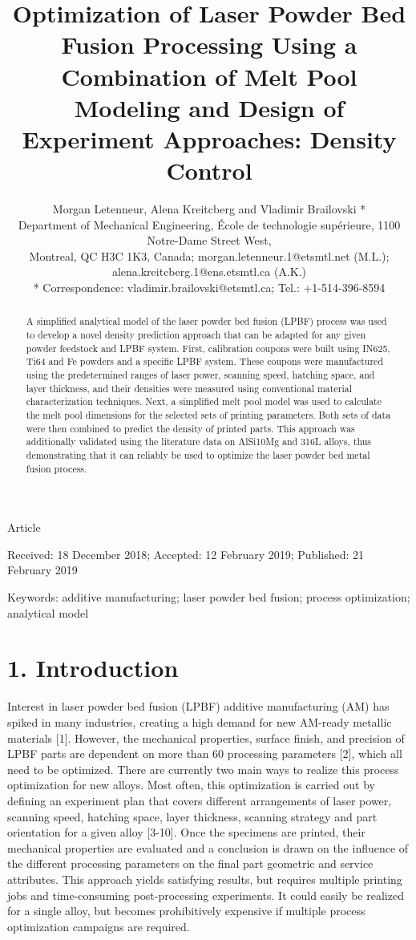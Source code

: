 \documentclass[10pt]{article}
\title{Optimization of Laser Powder Bed Fusion Processing Using a Combination of Melt Pool Modeling and Design of Experiment Approaches: Density Control }
\author{Morgan Letenneur, Alena Kreitcberg and Vladimir Brailovski *\\
Department of Mechanical Engineering, École de technologie supérieure, 1100 Notre-Dame Street West,\\
Montreal, QC H3C 1K3, Canada; morgan.letenneur.1@etsmtl.net (M.L.); alena.kreitcberg.1@ens.etsmtl.ca (A.K.)\\
* Correspondence: vladimir.brailovski@etsmtl.ca; Tel.: +1-514-396-8594}
\date{}
\begin{document}
\maketitle
Article

Received: 18 December 2018; Accepted: 12 February 2019; Published: 21 February 2019

\begin{abstract}
A simplified analytical model of the laser powder bed fusion (LPBF) process was used to develop a novel density prediction approach that can be adapted for any given powder feedstock and LPBF system. First, calibration coupons were built using IN625, Ti64 and Fe powders and a specific LPBF system. These coupons were manufactured using the predetermined ranges of laser power, scanning speed, hatching space, and layer thickness, and their densities were measured using conventional material characterization techniques. Next, a simplified melt pool model was used to calculate the melt pool dimensions for the selected sets of printing parameters. Both sets of data were then combined to predict the density of printed parts. This approach was additionally validated using the literature data on AlSi10Mg and 316L alloys, thus demonstrating that it can reliably be used to optimize the laser powder bed metal fusion process.
\end{abstract}

Keywords: additive manufacturing; laser powder bed fusion; process optimization; analytical model

\section*{1. Introduction}
Interest in laser powder bed fusion (LPBF) additive manufacturing (AM) has spiked in many industries, creating a high demand for new AM-ready metallic materials [1]. However, the mechanical properties, surface finish, and precision of LPBF parts are dependent on more than 60 processing parameters [2], which all need to be optimized. There are currently two main ways to realize this process optimization for new alloys. Most often, this optimization is carried out by defining an experiment plan that covers different arrangements of laser power, scanning speed, hatching space, layer thickness, scanning strategy and part orientation for a given alloy [3-10]. Once the specimens are printed, their mechanical properties are evaluated and a conclusion is drawn on the influence of the different processing parameters on the final part geometric and service attributes. This approach yields satisfying results, but requires multiple printing jobs and time-consuming post-processing experiments. It could easily be realized for a single alloy, but becomes prohibitively expensive if multiple process optimization campaigns are required.
\end{document}
